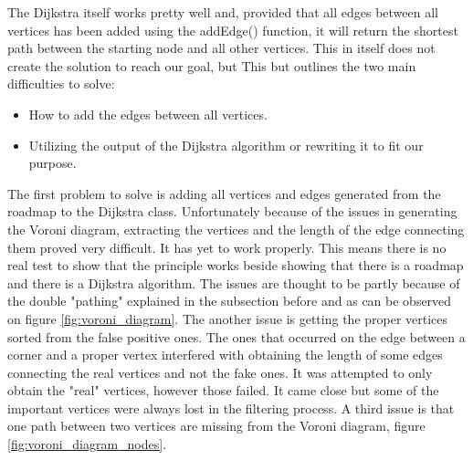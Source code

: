 \documentclass[../../../Main.tex]{subfiles}
\begin{document}
The Dijkstra itself works pretty well and, provided that all edges between all vertices has been added using the addEdge() function, it will return the shortest path between the starting node and all other vertices. This in itself does not create the solution to reach our goal, but This but outlines the two main difficulties to solve:
\begin{itemize}
  \item How to add the edges between all vertices.
  \item Utilizing the output of the Dijkstra algorithm or rewriting it to fit our purpose.
\end{itemize}
 The first problem to solve is adding all vertices and edges generated from the roadmap to the Dijkstra class.
 Unfortunately because of the issues in generating the Voroni diagram, extracting the vertices and the length of the edge connecting them proved very difficult.
 It has yet to work properly. This means there is no real test to show that the principle works beside showing that there is a roadmap and there is a Dijkstra algorithm.
 The issues are thought to be partly because of the double "pathing" explained in the subsection before and as can be observed on figure \ref{fig:voroni_diagram}.
 The another issue is getting the proper vertices sorted from the false positive ones. The ones that occurred on the edge between a corner and a proper vertex interfered with obtaining the length of some edges connecting the real vertices and not the fake ones. It was attempted to only obtain the "real" vertices, however those failed. It came close but some of the important vertices were always lost in the filtering process. A third  issue is that one path between two vertices are missing from the Voroni diagram, figure \ref{fig:voroni_diagram_nodes}.
\\
\end{document}
